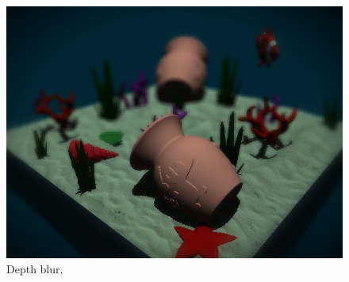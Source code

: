 \documentclass{article}
\begin{document}
\begin{figure}[h]
    \centering
    \includegraphics[width=\columnwidth]{imgs/blur_on.png}
    \caption{Depth blur.}
    \label{fig:blur}
\end{figure}

\newpage~\newpage
\appendix




\end{document}
